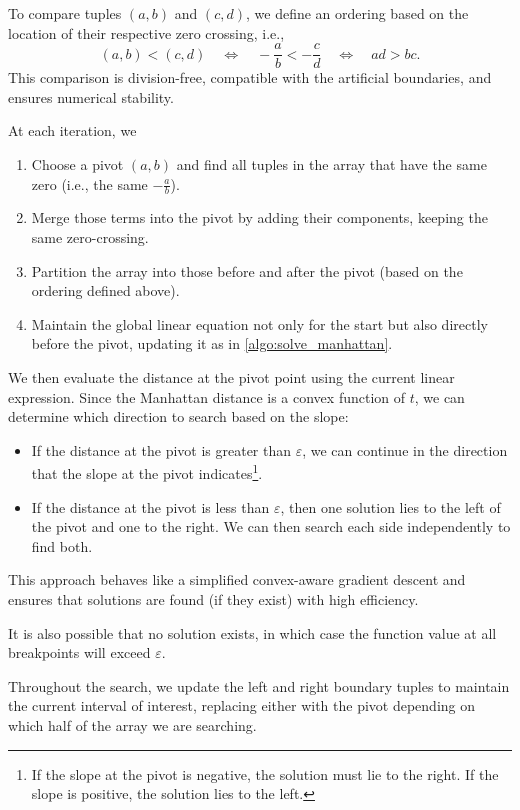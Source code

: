 To compare tuples \((a, b)\) and \( (c,d)\), we define an ordering based on the location of their respective zero crossing, i.e.,
  \[(a, b) < (c, d) \quad \iff \quad -\frac{a}{b} < - \frac{c}{d} \quad \iff \quad ad > bc.\]
This comparison is division-free, compatible with the artificial boundaries, and ensures numerical stability.  

At each iteration, we 
\begin{enumerate}
	\item Choose a pivot \((a, b)\)	and find all tuples in the array that have the same zero (i.e., the same \(-\frac{a}{b}\)).
	\item Merge those terms into the pivot by adding their components, keeping the same zero-crossing.
	\item Partition the array into those before and after the pivot (based on the ordering defined above).
	\item Maintain the global linear equation not only for the start but also directly before the pivot, updating it as in \cref{algo:solve_manhattan}.
\end{enumerate}

We then evaluate the distance at the pivot point using the current linear expression. Since the Manhattan distance is a convex function of \(t\), we can determine which direction to search based on the slope: 
\begin{itemize}
	\item If the distance at the pivot is greater than \(\varepsilon\), we can continue in the direction that the slope at the pivot indicates\footnote{If the slope at the pivot is negative, the solution must lie to the right. If the slope is positive, the solution lies to the left.}.
	\item If the distance at the pivot is less than \(\varepsilon\), then one solution lies to the left of the pivot and one to the right. We can then search each side independently to find both.
\end{itemize}

This approach behaves like a simplified convex-aware gradient descent and ensures that solutions are found (if they exist) with high efficiency. 

 It is also possible that no solution exists, in which case the function value at all breakpoints will exceed \(\varepsilon\). 

 Throughout the search, we update the left and right boundary tuples to maintain the current interval of interest, replacing either with the pivot depending on which half of the array we are searching. 

